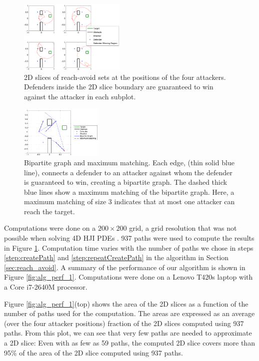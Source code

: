 \begin{figure}[H]
	\centering
	\includegraphics[width=0.45\textwidth]{"fig/fixed attacker PD 1"}
	\caption{2D slices of reach-avoid sets at the positions of the four attackers. Defenders  inside the 2D slice boundary are guaranteed to win against the attacker in each subplot.}
	\label{fig:fixed_a_1}
\end{figure}

\begin{figure}[H]
	\centering
	\includegraphics[width=0.35\textwidth]{"fig/max matching PD 1"}
	\caption{Bipartite graph and maximum matching. Each edge, (thin solid blue line), connects a defender to an attacker against whom the defender is guaranteed to win, creating a bipartite graph. The dashed thick blue lines show a maximum matching of the bipartite graph. Here, a maximum matching of size 3 indicates that at most one attacker can reach the target.}
	\label{fig:max_matching_1}
\end{figure}

Computations were done on a $200\times200$ grid, a grid resolution that was not possible when solving 4D HJI PDEs \cite{Chen2014}. 937 paths were used to compute the results in Figure \ref{fig:fixed_a_1}. Computation time varies with the number of paths we chose in steps \ref{step:createPath} and \ref{step:repeatCreatePath} in the algorithm in Section \ref{sec:reach_avoid}. A summary of the performance of our algorithm is shown in Figure \ref{fig:alg_perf_1}. Computations were done on a Lenovo T420s laptop with a Core i7-2640M processor. 

Figure \ref{fig:alg_perf_1}(top) shows the area of the 2D slices as a function of the number of paths used for the computation. The areas are expressed as an average (over the four attacker positions) fraction of the 2D slices computed using 937 paths. From this plot, we can see that very few paths are needed to approximate a 2D slice: Even with as few as 59 paths, the computed 2D slice covers more than 95\% of the area of the 2D slice computed using 937 paths.

